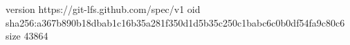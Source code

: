 version https://git-lfs.github.com/spec/v1
oid sha256:a367b890b18dbab1c16b35a281f350d1d5b35c250c1babc6c0b0df54fa9c80c6
size 43864
